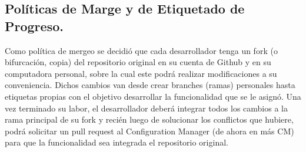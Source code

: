 \documentclass[10pt]{article} %
\begin{document}
\begin{figure}[H] %
\label{fig:Branch1}
\end{figure}

\begin{figure}[H] %
\label{fig:Branch2}
\end{figure}

\begin{figure}[H] %
\label{fig:Branch3}
\end{figure}

\begin{figure}[H] %
\label{fig:Branch4}
\end{figure}

\subsection{Políticas de Marge y de Etiquetado de Progreso.}
Como política de mergeo se decidió que cada desarrollador tenga un fork (o bifurcación, copia) del repositorio original en su cuenta de Github y en su computadora personal, sobre la cual este podrá realizar modificaciones a su conveniencia. Dichos cambios van desde crear branches (ramas) personales hasta etiquetas propias con el objetivo desarrollar la funcionalidad que se le asignó. Una vez terminado su labor, el desarrollador deberá integrar todos los cambios a la rama principal de su fork y recién luego de solucionar los conflictos que hubiere, podrá solicitar un pull request al Configuration Manager (de ahora en más CM) para que la funcionalidad sea integrada el repositorio original.
\end{document}
